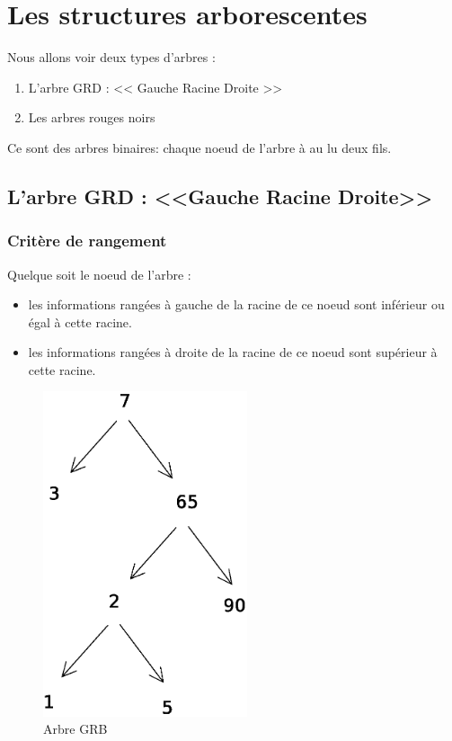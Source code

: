 \chapter{Les structures arborescentes}
\minitoc
Nous allons voir deux types d'arbres : 
\begin{enumerate}
	\item L'arbre GRD : << Gauche Racine Droite >>
	\item Les arbres rouges noirs
\end{enumerate}
Ce sont des arbres binaires: chaque noeud de l'arbre à au lu deux fils. 
\section{L'arbre GRD : <<Gauche Racine Droite>>}
	\subsection{Critère de rangement}
	Quelque soit le noeud de l'arbre : 
	\begin{itemize}
		\item les informations rangées à gauche de la racine de ce noeud sont inférieur ou égal à cette racine.
		\item les informations rangées à droite de la racine de ce noeud sont supérieur à cette racine.
	\end{itemize}
\begin{figure}[H]
\centering
\includegraphics[width=6cm]{content/schemas/arbresGRB.eps}
\caption{Arbre GRB}
\end{figure}
